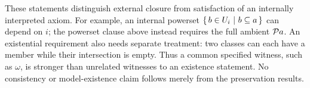 These statements distinguish external closure from satisfaction of an
internally interpreted axiom. For example, an internal powerset
$\left\{\,b\in U_i\ \middle|\ b\subseteq a\,\right\}$ can depend on $i$; the powerset clause
above instead requires the full ambient $\mathcal{P} a$. An existential
requirement also needs separate treatment: two classes can each have a
member while their intersection is empty. Thus a common specified witness,
such as $\omega$, is stronger than unrelated witnesses to an existence
statement. No consistency or model-existence claim follows merely from
the preservation results.

